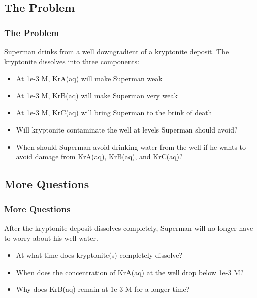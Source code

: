 \documentclass{beamer}
\newcommand\greencomment[1]{{{\color{green} #1}}}
\begin{document}
\subsection{The Problem}

\begin{frame}[fragile]\frametitle{The Problem}
Superman drinks from a well downgradient of a kryptonite deposit. The kryptonite dissolves into three components:

\begin{itemize}
  \item At 1e-3 M, \greencomment{KrA(aq)} will make Superman weak
  \item At 1e-3 M, \greencomment{KrB(aq)} will make Superman very weak
  \item At 1e-3 M, \greencomment{KrC(aq)} will bring Superman to the brink of death
\end{itemize}

\begin{itemize}
  \item Will kryptonite contaminate the well at levels Superman should avoid?
  \item When should Superman avoid drinking water from the well if he wants to avoid damage from \greencomment{KrA(aq)}, \greencomment{KrB(aq)}, and \greencomment{KrC(aq)}?
\end{itemize}

\end{frame}

\subsection{More Questions}

\begin{frame}[fragile]\frametitle{More Questions}
After the kryptonite deposit dissolves completely, Superman will no longer have to worry about his well water.

\begin{itemize}
  \item At what time does \greencomment{kryptonite(s)} completely dissolve?
  \item When does the concentration of \greencomment{KrA(aq)} at the well drop below 1e-3 M?
  \item Why does \greencomment{KrB(aq)} remain at 1e-3 M for a longer time?
\end{itemize}

\end{frame}
\end{document}
